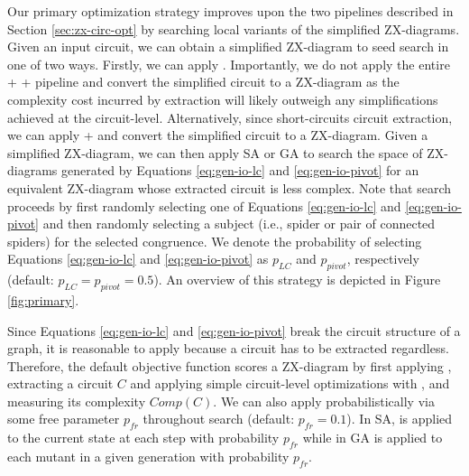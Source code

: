 Our primary optimization strategy improves upon the two pipelines described in Section \ref{sec:zx-circ-opt} by searching local variants of the simplified ZX-diagrams.
Given an input circuit, we can obtain a simplified ZX-diagram to seed search in one of two ways.
Firstly, we can apply .
Importantly, we do not apply the entire  +  +  pipeline and convert the simplified circuit to a ZX-diagram as the complexity cost incurred by extraction will likely outweigh any simplifications achieved at the circuit-level.
Alternatively, since  short-circuits circuit extraction, we can apply  +  and convert the simplified circuit to a ZX-diagram.
Given a simplified ZX-diagram, we can then apply SA or GA to search the space of ZX-diagrams generated by Equations \ref{eq:gen-io-lc} and \ref{eq:gen-io-pivot} for an equivalent ZX-diagram whose extracted circuit is less complex.
Note that search proceeds by first randomly selecting one of Equations \ref{eq:gen-io-lc} and \ref{eq:gen-io-pivot} and then randomly selecting a subject (i.e., spider or pair of connected spiders) for the selected congruence.
We denote the probability of selecting Equations \ref{eq:gen-io-lc} and \ref{eq:gen-io-pivot} as $p_{LC}$ and $p_{pivot}$, respectively (default: $p_{LC} = p_{pivot} = 0.5$).
An overview of this strategy is depicted in Figure \ref{fig:primary}.

Since Equations \ref{eq:gen-io-lc} and \ref{eq:gen-io-pivot} break the circuit structure of a graph, it is reasonable to apply  because a circuit has to be extracted regardless.
Therefore, the default objective function scores a ZX-diagram by first applying , extracting a circuit $C$ and applying simple circuit-level optimizations with , and measuring its complexity $Comp(C)$.
We can also apply  probabilistically via some free parameter $p_{fr}$ throughout search (default: $p_{fr} = 0.1$).
In SA,  is applied to the current state at each step with probability $p_{fr}$ while in GA  is applied to each mutant in a given generation with probability $p_{fr}$.

